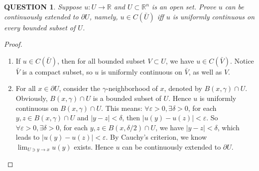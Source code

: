 \documentclass[12pt]{article}
\renewcommand{\(}{\left(}%
\renewcommand{\)}{\right)}%
\renewcommand{\[}{\left[}%
\renewcommand{\]}{\right]}%
\renewcommand{\r}{\mathbb{R}}
\newtheorem{question}{QUESTION}[section]}
\newtheorem{proof}{Proof.}}
\begin{document}
  \begin{question}
   Suppose $u:U\to \r$  and $U\subset\r^n$ is an open set. Prove $u$ can be continuously extended to $\partial U$, namely, $u\in C(\bar{U} )$ iff $u$ is uniformly continuous on every bounded subset of $U$.
  \end{question}
  \begin{proof}
   \begin{enumerate}
    \item If $u\in C(\bar{U})$, then for all bounded subset $V\subset U$, we have $u\in C(\bar{V})$. Notice $\bar{V}$ is a compact subset, so $u$ is uniformly continuous on $\bar{V}$, as well as $V$.
    \item For all $x\in\partial U$, consider the $\gamma$-neighborhood of $x$, denoted by $B(x,\gamma )\cap U$. Obviously, $B(x,\gamma )\cap U$ is a bounded subset of $U$. Hence $u$ is uniformly continuous on $B(x,\gamma )\cap U$. This means: $\forall\varepsilon>0,\exists \delta>0$, for each $y,z\in B(x,\gamma )\cap U$ and $|y-z|<\delta$, then $|u(y)-u(z)|<\varepsilon$.
    So $\forall\varepsilon>0,\exists\delta>0$, for each $y,z\in B(x,\delta/2 )\cap U$, we have $|y-z|<\delta$, which leads to $|u(y)-u(z)|<\varepsilon$. By Cauchy's criterion, we know $\lim_{U\ni y\to x}u(y)$ exists. Hence $u$ can be continuously extended to $\partial U$.
   \end{enumerate}
  \end{proof}
\end{document}

